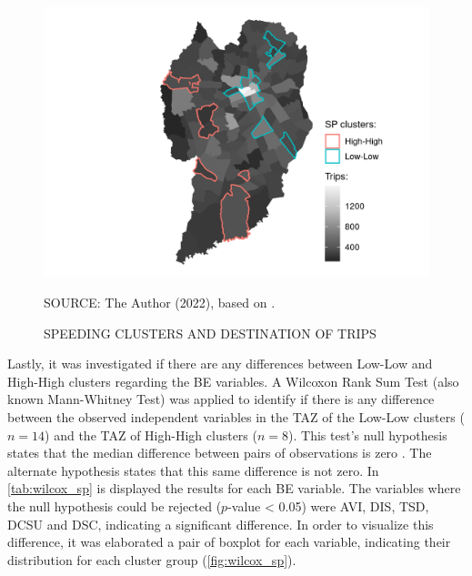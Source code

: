 \begin{figure}[!htbp]
    \footnotesize
    \captionsetup{font=footnotesize}
    \caption{SPEEDING CLUSTERS AND DESTINATION OF TRIPS}
    \centering
    \includegraphics{fig/od_plot.png}
    \label{fig:sp_od}
    \par SOURCE: The Author (2022), based on \textcite{IPPUC2018b}.
\end{figure}

Lastly, it was investigated if there are any differences between Low-Low and High-High clusters regarding the BE variables. A Wilcoxon Rank Sum Test (also known Mann-Whitney Test) was applied to identify if there is any difference between the observed independent variables in the TAZ of the Low-Low clusters ($n = 14$) and the TAZ of High-High clusters ($n = 8$). This test's null hypothesis states that the median difference between pairs of observations is zero \cite{hollanderNonparametricStatisticalMethods2015}. The alternate hypothesis states that this same difference is not zero. In \autoref{tab:wilcox_sp} is displayed the results for each BE variable. The variables where the null hypothesis could be rejected ($p$-value < 0.05) were AVI, DIS, TSD, DCSU and DSC, indicating a significant difference. In order to visualize this difference, it was elaborated a pair of boxplot for each variable, indicating their distribution for each cluster group (\autoref{fig:wilcox_sp}).

